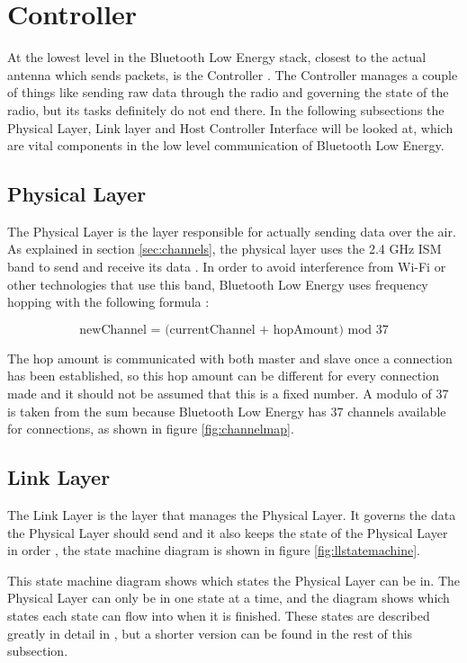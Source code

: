 \documentclass[pdftex,a4paper,12pt,twoside]{report}
\begin{document}
\section{Controller}
\label{sec:stackController}
At the lowest level in the Bluetooth Low Energy stack, closest to the actual antenna which sends packets, is the Controller \citep{Townsend2014}. The Controller manages a couple of things like sending raw data through the radio and governing the state of the radio, but its tasks definitely do not end there. In the following subsections the Physical Layer, Link layer and Host Controller Interface will be looked at, which are vital components in the low level communication of Bluetooth Low Energy.

\subsection{Physical Layer}
\label{subsec:controllerPHY}
The Physical Layer is the layer responsible for actually sending data over the air. As explained in section \ref{sec:channels}, the physical layer uses the 2.4 GHz ISM band to send and receive its data \citep{bluetooth2014bluetooth}. In order to avoid interference from Wi-Fi or other technologies that use this band, Bluetooth Low Energy uses frequency hopping with the following formula \citep{heydon2012bluetooth}:

\begin{equation*}
\text{newChannel = (currentChannel + hopAmount) mod 37}
\end{equation*}

The hop amount is communicated with both master and slave once a connection has been established, so this hop amount can be different for every connection made and it should not be assumed that this is a fixed number. A modulo of 37 is taken from the sum because Bluetooth Low Energy has 37 channels available for connections, as shown in figure \ref{fig:channelmap}.

\subsection{Link Layer}
\label{subsec:controllerLL}
The Link Layer is the layer that manages the Physical Layer. It governs the data the Physical Layer should send and it also keeps the state of the Physical Layer in order \citep{heydon2012bluetooth}, the state machine diagram is shown in figure \ref{fig:llstatemachine}. 

This state machine diagram shows which states the Physical Layer can be in. The Physical Layer can only be in one state at a time, and the diagram shows which states each state can flow into when it is finished. These states are described greatly in detail in \cite{bluetooth2014bluetooth}, but a shorter version can be found in the rest of this subsection.
\end{document}
